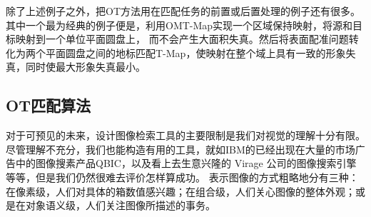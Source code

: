 除了上述例子之外，把OT方法用在匹配任务的前置或后置处理的例子还有很多。其中一个最为经典的例子便是\cite{ma2017robust}，利用OMT-Map实现一个区域保持映射，将源和目标映射到一个单位平面圆盘上，
而不会产生大面积失真。然后将表面配准问题转化为两个平面圆盘之间的地标匹配T-Map，使映射在整个域上具有一致的形象失真，同时使最大形象失真最小。

\subsection{OT匹配算法}

对于可预见的未来，设计图像检索工具的主要限制是我们对视觉的理解十分有限。尽管理解不充分，我们也能构造有用的工具，就如IBM的已经出现在大量的市场广告中的图像搜素产品QBIC，以及看上去生意兴隆的
Virage 公司的图像搜索引擎等等，但是我们仍然很难去评价怎样算成功。
表示图像的方式粗略地分有三种：在像素级，人们对具体的箱数值感兴趣；在组合级，人们关心图像的整体外观；或是在对象语义级，人们关注图像所描述的事务。


